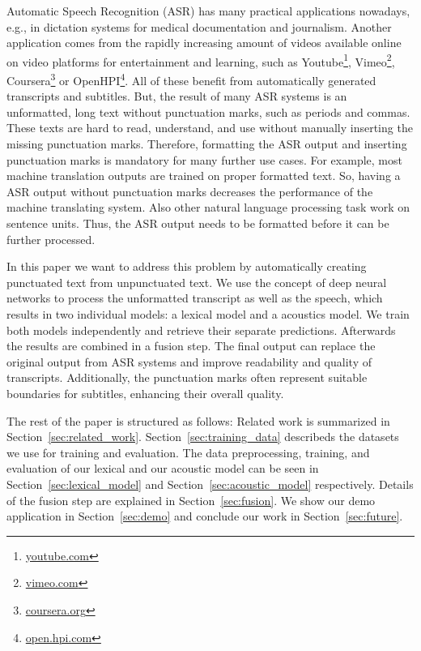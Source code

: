 Automatic Speech Recognition (ASR) has many practical applications nowadays, e.g., in dictation systems for medical documentation and journalism.
Another application comes from the rapidly increasing amount of videos available online on video platforms for entertainment and learning, such as Youtube\footnote{\url{youtube.com}}, Vimeo\footnote{\url{vimeo.com}}, Coursera\footnote{\url{coursera.org}} or OpenHPI\footnote{\url{open.hpi.com}}.
All of these benefit from automatically generated transcripts and subtitles.
But, the result of many ASR systems is an unformatted, long text without punctuation marks, such as periods and commas.
These texts are hard to read, understand, and use without manually inserting the missing punctuation marks.
Therefore, formatting the ASR output and inserting punctuation marks is mandatory for many further use cases.
For example, most machine translation outputs are trained on proper formatted text.
So, having a ASR output without punctuation marks decreases the performance of the machine translating system.
Also other natural language processing task work on sentence units.
Thus, the ASR output needs to be formatted before it can be further processed.

In this paper we want to address this problem by automatically creating punctuated text from unpunctuated text.
We use the concept of deep neural networks to process the unformatted transcript as well as the speech, which results in two individual models: a lexical model and a acoustics model.
We train both models independently and retrieve their separate predictions.
Afterwards the results are combined in a fusion step.
The final output can replace the original output from ASR systems and improve readability and quality of transcripts.
Additionally, the punctuation marks often represent suitable boundaries for subtitles, enhancing their overall quality.

The rest of the paper is structured as follows:
Related work is summarized in Section~\ref{sec:related_work}.
Section~\ref{sec:training_data} describeds the datasets we use for training and evaluation.
The data preprocessing, training, and evaluation of our lexical and our acoustic model can be seen in Section~\ref{sec:lexical_model} and Section~\ref{sec:acoustic_model} respectively.
Details of the fusion step are explained in Section~\ref{sec:fusion}.
We show our demo application in Section~\ref{sec:demo} and conclude our work in Section~\ref{sec:future}.
